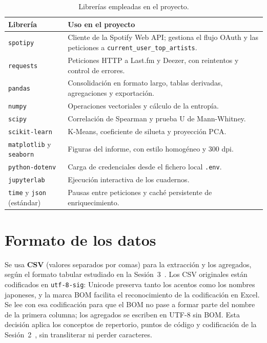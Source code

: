 \begin{table}[H]
    \centering
    \renewcommand{\arraystretch}{1.4}
    \begin{tabular}{|p{}|p{}|}
        \hline
        \textbf{Librería} & \textbf{Uso en el proyecto} \\
        \hline
        \texttt{spotipy} & Cliente de la Spotify Web API; gestiona el flujo OAuth y las peticiones a \nolinkurl{current_user_top_artists}. \\
        \hline
        \texttt{requests} & Peticiones HTTP a Last.fm y Deezer, con reintentos y control de errores. \\
        \hline
        \texttt{pandas} & Consolidación en formato largo, tablas derivadas, agregaciones y exportación. \\
        \hline
        \texttt{numpy} & Operaciones vectoriales y cálculo de la entropía. \\
        \hline
        \texttt{scipy} & Correlación de Spearman y prueba U de Mann-Whitney. \\
        \hline
        \texttt{scikit-learn} & K-Means, coeficiente de silueta y proyección PCA. \\
        \hline
        \texttt{matplotlib} y \texttt{seaborn} & Figuras del informe, con estilo homogéneo y 300 dpi. \\
        \hline
        \texttt{python-dotenv} & Carga de credenciales desde el fichero local \texttt{.env}. \\
        \hline
        \texttt{jupyterlab} & Ejecución interactiva de los cuadernos. \\
        \hline
        \texttt{time} y \texttt{json} (estándar) & Pausas entre peticiones y caché persistente de enriquecimiento. \\
        \hline
    \end{tabular}
    \caption{Librerías empleadas en el proyecto.}
    \label{tab:librerias}
\end{table}

\section{Formato de los datos}
\label{sec:formato}

Se usa \textbf{CSV} (valores separados por comas) para la extracción y los agregados, según el formato tabular estudiado en la Sesión~3~\cite{sesion3}. Los CSV originales están codificados en \texttt{utf-8-sig}: Unicode preserva tanto los acentos como los nombres japoneses, y la marca BOM facilita el reconocimiento de la codificación en Excel. Se lee con esa codificación para que el BOM no pase a formar parte del nombre de la primera columna; los agregados se escriben en UTF-8 sin BOM. Esta decisión aplica los conceptos de repertorio, puntos de código y codificación de la Sesión~2~\cite{sesion2}, sin transliterar ni perder caracteres.

